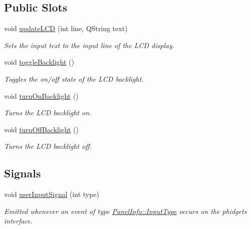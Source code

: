 \subsection*{Public Slots}
\begin{DoxyCompactItemize}
\item 
void \hyperlink{class_phidgets_a671c347d2ee668a37ac15dbb5f592d00}{update\-L\-C\-D} (int line, Q\-String text)
\begin{DoxyCompactList}\small\item\em Sets the input text to the input line of the L\-C\-D display. \end{DoxyCompactList}\item 
\hypertarget{class_phidgets_af591ba9e328736f3ed6612bdffb31a4d}{void \hyperlink{class_phidgets_af591ba9e328736f3ed6612bdffb31a4d}{toggle\-Backlight} ()}\label{class_phidgets_af591ba9e328736f3ed6612bdffb31a4d}

\begin{DoxyCompactList}\small\item\em Toggles the on/off state of the L\-C\-D backlight. \end{DoxyCompactList}\item 
\hypertarget{class_phidgets_ad1015686646d691086d80865c22882ae}{void \hyperlink{class_phidgets_ad1015686646d691086d80865c22882ae}{turn\-On\-Backlight} ()}\label{class_phidgets_ad1015686646d691086d80865c22882ae}

\begin{DoxyCompactList}\small\item\em Turns the L\-C\-D backlight on. \end{DoxyCompactList}\item 
\hypertarget{class_phidgets_af68c34e86d32785a243afcb7f516ebf0}{void \hyperlink{class_phidgets_af68c34e86d32785a243afcb7f516ebf0}{turn\-Off\-Backlight} ()}\label{class_phidgets_af68c34e86d32785a243afcb7f516ebf0}

\begin{DoxyCompactList}\small\item\em Turns the L\-C\-D backlight off. \end{DoxyCompactList}\end{DoxyCompactItemize}
\subsection*{Signals}
\begin{DoxyCompactItemize}
\item 
\hypertarget{class_phidgets_ae7d52dbe0d79927159f570746d99f279}{void \hyperlink{class_phidgets_ae7d52dbe0d79927159f570746d99f279}{user\-Input\-Signal} (int type)}\label{class_phidgets_ae7d52dbe0d79927159f570746d99f279}

\begin{DoxyCompactList}\small\item\em Emitted whenever an event of type \hyperlink{namespace_panel_info_aeeb3b627166cd15c3898f93a1a499c65}{Panel\-Info\-::\-Input\-Type} occurs on the phidgets interface. \end{DoxyCompactList}\end{DoxyCompactItemize}
